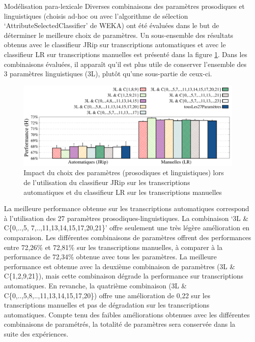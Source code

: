 \documentclass{style/these}
\begin{document}
\begin{part}{Modélisation para-lexicale}
Diverses combinaisons des paramètres prosodiques et linguistiques (choisis ad-hoc ou avec l'algorithme de sélection `AttributeSelectedClassifier' de WEKA) ont été évaluées dans le but de déterminer le meilleure choix de paramètres. 
Un sous-ensemble des résultats obtenus avec le classifieur JRip sur transcriptions automatiques et avec le classifieur LR sur transcriptions manuelles est présenté dans la figure \ref{Fig:QD-C-CFeatures-JRip}. 
Dans les combinaisons évaluées, il apparaît qu'il est plus utile de conserver l'ensemble des 3 paramètres linguistiques (3L), plutôt qu'une sous-partie de ceux-ci.  

\begin{figure}[h!]
\centering
\includegraphics[scale=0.54]{images/results/combinedClassifier_compareFeatures.pdf}
\caption{Impact du choix des paramètres (prosodiques et linguistiques) lors de l'utilisation du classifieur JRip sur les transcriptions automatiques et du classifieur LR sur les transcriptions manuelles}
\label{Fig:QD-C-CFeatures-JRip}
\end{figure}

La meilleure performance obtenue sur les transcriptions automatiques correspond à l'utilisation des 27 paramètres prosodiques-linguistiques. 
La combinaison `3L \& C\{0,..,5, 7,..,11,13,14,15,17,20,21\}' offre seulement une très légère amélioration en comparaison. 
Les différentes combinaisons de paramètres offrent des performances entre 72,26\% et 72,81\% sur les transcriptions manuelles, à comparer à la performance de 72,34\% obtenue avec tous les paramètres. 
La meilleure performance est obtenue avec la deuxième combinaison de paramètres (3L \& C\{1,2,9,21\}), mais cette combinaison dégrade la performance sur transcriptions automatiques. 
En revanche, la quatrième combinaison (3L \& C\{0,..,5,8,..,11,13,14,15,17,20\}) offre une amélioration de 0,22 sur les transcriptions manuelles et pas de dégradation sur les  transcriptions automatiques. 
Compte tenu des faibles améliorations obtenues avec les différentes combinaisons de paramétrés, la totalité de paramètres sera conservée dans la suite des expériences. 


\end{part}
\end{document}
